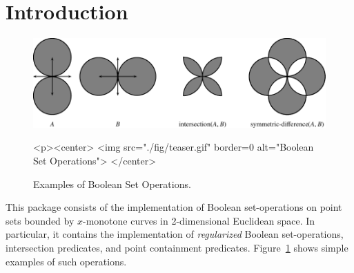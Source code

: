 \lcTex{%
  \newlength{\widthExtra}\setlength{\widthExtra}{1.1cm}
  \newlength{\widthLineReal}\setlength{\widthLineReal}{\linewidth}
  \addtolength{\widthLineReal}{-\widthExtra}
  \newlength{\minipageSpace}\setlength{\minipageSpace}{0.2cm}

  \newlength{\widthLeft}
  \newlength{\widthRight}
}

\newcommand{\reals}{{\rm I\!\hspace{-0.025em} R}}
\newcommand{\calC}{{\cal C}}
\newcommand{\calA}{{\cal A}}
\newcommand{\eps}{{\varepsilon}}
\newcommand{\dcel}{{\sc Dcel}}
\newcommand{\naive}{na\"{\i}ve}
\newcommand{\kdtree}{{\sc Kd}-tree}

\section{Introduction}
\label{bobs_sec:intro}
%
\begin{figure}[!htp]
\begin{center}
\begin{ccTexOnly}
  \includegraphics{Boolean_set_operations_2/fig/teaser}
\end{ccTexOnly}
\label{fig:teaser}
\begin{ccHtmlOnly}
  <p><center>
    <img src="./fig/teaser.gif" border=0 alt="Boolean Set Operations">
  </center>
\end{ccHtmlOnly}
\caption{Examples of Boolean Set Operations.} 
\end{center}
\end{figure}

This package consists of the implementation of Boolean set-operations
on point sets bounded by $x$-monotone curves in 2-dimensional
Euclidean space. In particular, it contains the implementation of
{\em regularized} Boolean set-operations, intersection predicates, and
point containment predicates. Figure~\ref{fig:teaser} shows simple examples 
of such operations.

